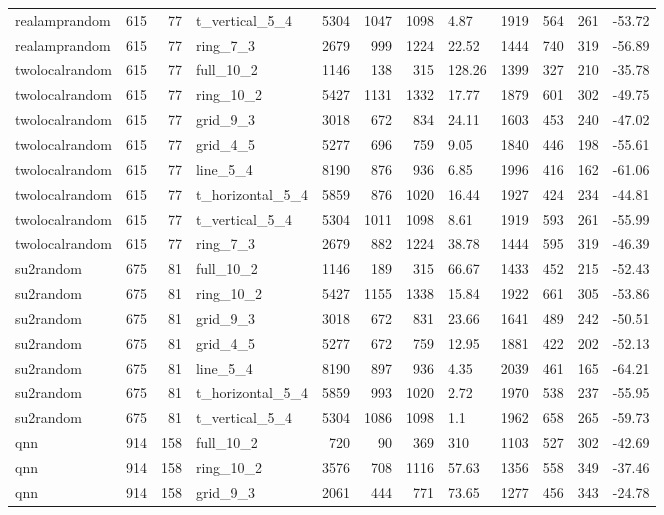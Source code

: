 \begin{longtable}{lrrlrrrlrrrl}
realamprandom & 615 & 77 & t\_vertical\_5\_4 & 5304 & 1047 & 1098 & 4.87 & 1919 & 564 & 261 & -53.72 \\
realamprandom & 615 & 77 & ring\_7\_3 & 2679 & 999 & 1224 & 22.52 & 1444 & 740 & 319 & -56.89 \\
twolocalrandom & 615 & 77 & full\_10\_2 & 1146 & 138 & 315 & 128.26 & 1399 & 327 & 210 & -35.78 \\
twolocalrandom & 615 & 77 & ring\_10\_2 & 5427 & 1131 & 1332 & 17.77 & 1879 & 601 & 302 & -49.75 \\
twolocalrandom & 615 & 77 & grid\_9\_3 & 3018 & 672 & 834 & 24.11 & 1603 & 453 & 240 & -47.02 \\
twolocalrandom & 615 & 77 & grid\_4\_5 & 5277 & 696 & 759 & 9.05 & 1840 & 446 & 198 & -55.61 \\
twolocalrandom & 615 & 77 & line\_5\_4 & 8190 & 876 & 936 & 6.85 & 1996 & 416 & 162 & -61.06 \\
twolocalrandom & 615 & 77 & t\_horizontal\_5\_4 & 5859 & 876 & 1020 & 16.44 & 1927 & 424 & 234 & -44.81 \\
twolocalrandom & 615 & 77 & t\_vertical\_5\_4 & 5304 & 1011 & 1098 & 8.61 & 1919 & 593 & 261 & -55.99 \\
twolocalrandom & 615 & 77 & ring\_7\_3 & 2679 & 882 & 1224 & 38.78 & 1444 & 595 & 319 & -46.39 \\
su2random & 675 & 81 & full\_10\_2 & 1146 & 189 & 315 & 66.67 & 1433 & 452 & 215 & -52.43 \\
su2random & 675 & 81 & ring\_10\_2 & 5427 & 1155 & 1338 & 15.84 & 1922 & 661 & 305 & -53.86 \\
su2random & 675 & 81 & grid\_9\_3 & 3018 & 672 & 831 & 23.66 & 1641 & 489 & 242 & -50.51 \\
su2random & 675 & 81 & grid\_4\_5 & 5277 & 672 & 759 & 12.95 & 1881 & 422 & 202 & -52.13 \\
su2random & 675 & 81 & line\_5\_4 & 8190 & 897 & 936 & 4.35 & 2039 & 461 & 165 & -64.21 \\
su2random & 675 & 81 & t\_horizontal\_5\_4 & 5859 & 993 & 1020 & 2.72 & 1970 & 538 & 237 & -55.95 \\
su2random & 675 & 81 & t\_vertical\_5\_4 & 5304 & 1086 & 1098 & 1.1 & 1962 & 658 & 265 & -59.73 \\
qnn & 914 & 158 & full\_10\_2 & 720 & 90 & 369 & 310 & 1103 & 527 & 302 & -42.69 \\
qnn & 914 & 158 & ring\_10\_2 & 3576 & 708 & 1116 & 57.63 & 1356 & 558 & 349 & -37.46 \\
qnn & 914 & 158 & grid\_9\_3 & 2061 & 444 & 771 & 73.65 & 1277 & 456 & 343 & -24.78 \\

\end{longtable}
